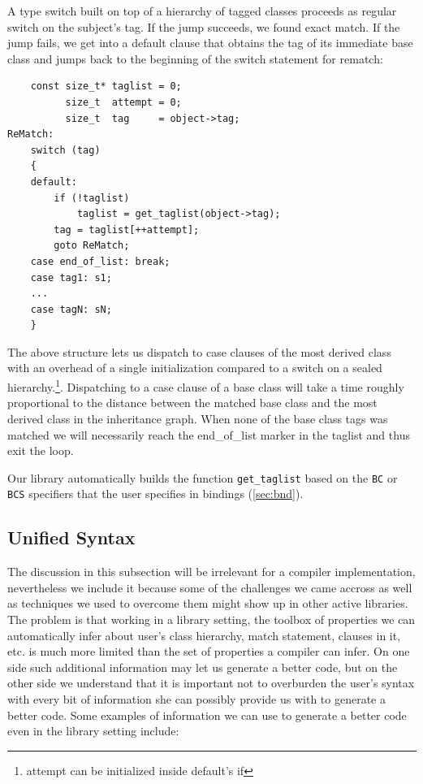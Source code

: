 \documentclass[preprint]{sigplanconf}
\makeatletter
\DeclareRobustCommand{\code}[1]{{\lstinline[breaklines=false,escapechar=@]{#1}}}
\makeatother
\begin{document}
A type switch built on top of a hierarchy of tagged classes proceeds as regular 
switch on the subject's tag. If the jump succeeds, we found exact match. If the 
jump fails, we get into a default clause that obtains the tag of its immediate 
base class and jumps back to the beginning of the switch statement for rematch:

\begin{lstlisting}
    const size_t* taglist = 0;
          size_t  attempt = 0;
          size_t  tag     = object->tag;
ReMatch:
    switch (tag) 
    {
    default:
        if (!taglist) 
            taglist = get_taglist(object->tag);
        tag = taglist[++attempt];
        goto ReMatch;
    case end_of_list: break;
    case tag1: s1;
    ...
    case tagN: sN;
    }
\end{lstlisting}

The above structure lets us dispatch to case clauses of the most derived class 
with an overhead of a single initialization compared to a switch on a sealed 
hierarchy.\footnote{attempt can be initialized inside default's if}. Dispatching 
to a case clause of a base class will take a time roughly proportional to the 
distance between the matched base class and the most derived class in the 
inheritance graph. When none of the base class tags was matched we will 
necessarily reach the end\_of\_list marker in the taglist and thus exit the 
loop.

Our library automatically builds the function \code{get_taglist} based on the 
\code{BC} or \code{BCS} specifiers that the user specifies in bindings 
(\textsection\ref{sec:bnd}).

\subsection{Unified Syntax}
\label{sec:unisyn}

The discussion in this subsection will be irrelevant for a compiler 
implementation, nevertheless we include it because some of the challenges we 
came accross as well as techniques we used to overcome them might show up in 
other active libraries. The problem is that working in a library setting, the 
toolbox of properties we can automatically infer about user's class hierarchy, 
match statement, clauses in it, etc. is much more limited than the set of 
properties a compiler can infer. On one side such additional information may let 
us generate a better code, but on the other side we understand that it is 
important not to overburden the user's syntax with every bit of information she 
can possibly provide us with to generate a better code. Some examples of 
information we can use to generate a better code even in the library setting 
include:
\end{document}
